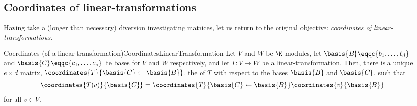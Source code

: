 \subsection{Coordinates of linear-transformations}\label{sbs3.2.2}

Having take a (longer than necessary) diversion investigating matrices, let us return to the original objective:  \emph{coordinates of linear-transformations}.
\begin{thm}{Coordinates (of a linear-transform\-ation)}{CoordinatesLinearTransformation}
	Let $V$ and $W$ be $\K$-modules, let $\basis{B}\eqqc \{ b_1,\ldots ,b_d\}$ and $\basis{C}\eqqc \{ c_1,\ldots ,c_e\}$ be bases for $V$ and $W$ respectively, and let $T\colon V\rightarrow W$ be a linear-transformation.  Then, there is a unique $e\times d$ matrix, $\coordinates{T}{\basis{C}\leftarrow \basis{B}}$, the  of $T$ with respect to the bases $\basis{B}$ and $\basis{C}$, such that
	\begin{equation}\label{eqn1.2.115}
		\coordinates{T(v)}{\basis{C}}=\coordinates{T}{\basis{C}\leftarrow \basis{B}}\coordinates{v}{\basis{B}}
	\end{equation}
	for all $v\in V$.
	

\end{thm}

